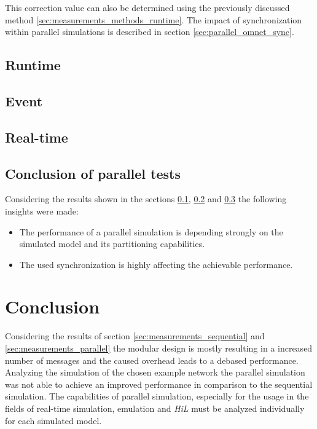This correction value can also be determined using the previously discussed method \ref{sec:measurements_methods_runtime}.
The impact of synchronization within parallel simulations is described in section \ref{sec:parallel_omnet_sync}.

\subsection{Runtime}
\label{sec:measurements_parallel_runtime}


\subsection{Event}
\label{sec:measurements_parallel_event}


\subsection{Real-time}
\label{sec:measurements_parallel_realtime}

\subsection{Conclusion of parallel tests}

Considering the results shown in the sections \ref{sec:measurements_parallel_runtime}, \ref{sec:measurements_parallel_event} and \ref{sec:measurements_parallel_realtime} the following insights were made:

\begin{itemize}
    \item The performance of a parallel simulation is depending strongly on the simulated model and its partitioning capabilities.
    \item The used synchronization is highly affecting the achievable performance.
\end{itemize}

\section{Conclusion}
Considering the results of section \ref{sec:measurements_sequential} and \ref{sec:measurements_parallel} the modular design is mostly resulting in a increased number of messages and the caused overhead leads to a debased performance.
Analyzing the simulation of the chosen example network the parallel simulation was not able to achieve an improved performance in comparison to the sequential simulation.
The capabilities of parallel simulation, especially for the usage in the fields of real-time simulation, emulation and \emph{HiL} must be analyzed individually for each simulated model. 
